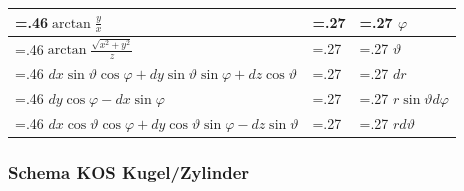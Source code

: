 \begin{tabularx}{0.45\textwidth}{>{\hsize=.46\hsize}X|>{\hsize=.27\hsize}X|>{\hsize=.27\hsize}X}
			\hline
			$\arctan \frac{y}{x}$                                                                &                  & $\varphi$                       \\
			\hline
			$\arctan \frac{\sqrt{x^{2}+y^{2}}}{z}$                                               &                  & $\vartheta$                     \\
			\hline
			$d x \sin \vartheta \cos \varphi+d y \sin \vartheta \sin \varphi+d z \cos \vartheta$ &                  & $dr$                            \\
			\hline
			$d y \cos \varphi-d x \sin \varphi$                                                  &                  & $r \sin \vartheta d \varphi$    \\
			\hline
			$d x \cos \vartheta \cos \varphi+d y \cos \vartheta \sin \varphi-d z \sin \vartheta$ &                  & $r d \vartheta$                 \\
		\end{tabularx}

	\subsubsection{Schema KOS Kugel/Zylinder}
		
